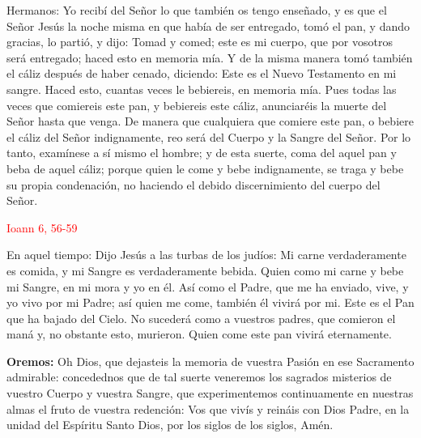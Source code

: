 \documentclass[10pt]{article}
\begin{document}
\begin{multicols}{2}
      Hermanos: Yo recibí del Señor lo que también os tengo enseñado, y es que el Señor Jesús la noche misma en que había de ser entregado, tomó el pan, y dando gracias, lo partió, y dijo:
      Tomad y comed; este es mi cuerpo, que por vosotros será entregado; haced esto en memoria mía. Y de la misma manera tomó también el cáliz después de haber cenado, diciendo: Este es el
      Nuevo Testamento en mi sangre. Haced esto, cuantas veces le bebiereis, en memoria mía. Pues todas las veces que comiereis este pan, y bebiereis este cáliz, anunciaréis la muerte del
      Señor hasta que venga. De manera que cualquiera que comiere este pan, o bebiere el cáliz del Señor indignamente, reo será del Cuerpo y la Sangre del Señor. Por lo tanto, examínese a
      sí mismo el hombre; y de esta suerte, coma del aquel pan y beba de aquel cáliz; porque quien le come y bebe indignamente, se traga y bebe su propia condenación, no haciendo el debido
      discernimiento del cuerpo del Señor.\newline

      \hfill\textcolor{red}{Ioann 6, 56-59}

      En aquel tiempo: Dijo Jesús a las turbas de los judíos: Mi carne verdaderamente es comida, y mi Sangre es verdaderamente bebida. Quien como mi carne y bebe mi Sangre, en mi mora y yo en él.
      Así como el Padre, que me ha enviado, vive, y yo vivo por mi Padre; así quien me come, también él vivirá por mi. Este es el Pan que ha bajado del Cielo. No sucederá como a vuestros padres,
      que comieron el maná y, no obstante esto, murieron. Quien come este pan vivirá eternamente.\newline

      \begin{otherlanguage}{latin}
            

            

            
      \end{otherlanguage}
      \newline

      \textbf{Oremos:} Oh Dios, que dejasteis la memoria de vuestra Pasión en ese Sacramento admirable: concedednos que de tal suerte veneremos los sagrados misterios de vuestro Cuerpo 
      y vuestra Sangre, que experimentemos continuamente en nuestras almas el fruto de vuestra redención: Vos que vivís y reináis con Dios Padre, en la unidad del Espíritu Santo Dios, 
      por los siglos de los siglos, Amén.


\end{multicols}
\end{document}
